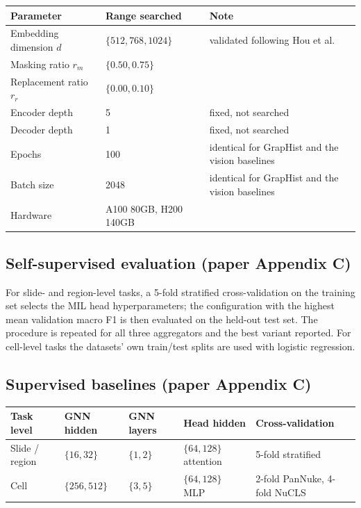 \documentclass[10pt,a4paper]{article}
\begin{document}
\begin{longtable}{@{}p{5.4cm}p{4.6cm}p{5.4cm}@{}}
\toprule
\textbf{Parameter} & \textbf{Range searched} & \textbf{Note} \\
\midrule \endhead
Embedding dimension $d$ & $\{512, 768, 1024\}$ & validated following Hou et al. \\
Masking ratio $r_m$ & $\{0.50, 0.75\}$ & \\
Replacement ratio $r_r$ & $\{0.00, 0.10\}$ & \\
Encoder depth & 5 & fixed, not searched \\
Decoder depth & 1 & fixed, not searched \\
Epochs & 100 & identical for GrapHist and the vision baselines \\
Batch size & 2048 & identical for GrapHist and the vision baselines \\
Hardware & A100 80GB, H200 140GB & \\
\bottomrule
\end{longtable}

\subsection{Self-supervised evaluation (paper Appendix C)}

For slide- and region-level tasks, a 5-fold stratified cross-validation on the
training set selects the MIL head hyperparameters; the configuration with the
highest mean validation macro F1 is then evaluated on the held-out test set. The
procedure is repeated for all three aggregators and the best variant reported.
For cell-level tasks the datasets' own train/test splits are used with logistic
regression.

\subsection{Supervised baselines (paper Appendix C)}

\begin{longtable}{@{}p{3.6cm}p{2.9cm}p{2.5cm}p{3.1cm}p{3.2cm}@{}}
\toprule
\textbf{Task level} & \textbf{GNN hidden} & \textbf{GNN layers} & \textbf{Head hidden} & \textbf{Cross-validation} \\
\midrule \endhead
Slide / region & $\{16, 32\}$ & $\{1, 2\}$ & $\{64, 128\}$ attention & 5-fold stratified \\
Cell & $\{256, 512\}$ & $\{3, 5\}$ & $\{64, 128\}$ MLP & 2-fold PanNuke, 4-fold NuCLS \\
\bottomrule
\end{longtable}
\end{document}

